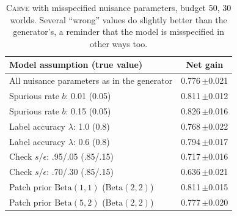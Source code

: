 \documentclass[11pt]{article}
\newcommand{\carve}{\textsc{Carve}}
\begin{document}
\begin{table}[h]
\centering
\small
\begin{tabular}{lc}
\toprule
Model assumption (true value) & Net gain \\
\midrule
All nuisance parameters as in the generator & 0.776\,{\scriptsize$\pm$0.021}\\
Spurious rate $b$: 0.01 (0.05) & 0.811\,{\scriptsize$\pm$0.012}\\
Spurious rate $b$: 0.15 (0.05) & 0.826\,{\scriptsize$\pm$0.016}\\
Label accuracy $\lambda$: 1.0 (0.8) & 0.768\,{\scriptsize$\pm$0.022}\\
Label accuracy $\lambda$: 0.6 (0.8) & 0.794\,{\scriptsize$\pm$0.017}\\
Check $s/\epsilon$: .95/.05 (.85/.15) & 0.717\,{\scriptsize$\pm$0.016}\\
Check $s/\epsilon$: .70/.30 (.85/.15) & 0.636\,{\scriptsize$\pm$0.021}\\
Patch prior $\mathrm{Beta}(1,1)$ ($\mathrm{Beta}(2,2)$) & 0.811\,{\scriptsize$\pm$0.015}\\
Patch prior $\mathrm{Beta}(5,2)$ ($\mathrm{Beta}(2,2)$) & 0.777\,{\scriptsize$\pm$0.020}\\
\bottomrule
\end{tabular}
\caption{\carve{} with misspecified nuisance parameters, budget 50, 30 worlds. Several ``wrong'' values do slightly better than the generator's, a reminder that the model is misspecified in other ways too.}
\label{tab:misspec}
\end{table}



\end{document}
